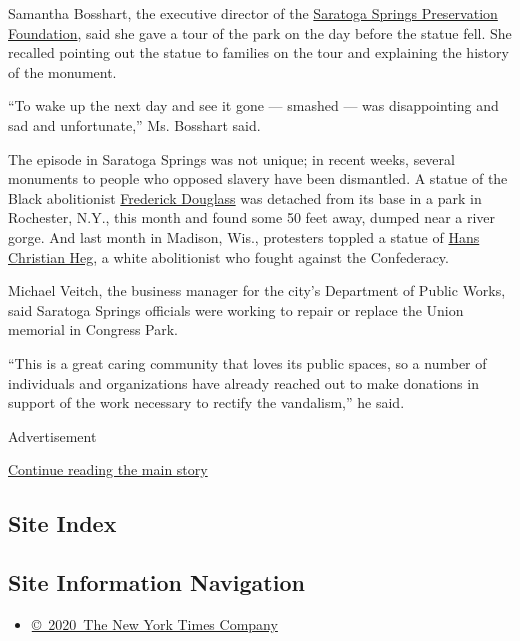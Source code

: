 Samantha Bosshart, the executive director of the
\href{https://www.saratogapreservation.org/}{Saratoga Springs
Preservation Foundation}, said she gave a tour of the park on the day
before the statue fell. She recalled pointing out the statue to families
on the tour and explaining the history of the monument.

``To wake up the next day and see it gone --- smashed --- was
disappointing and sad and unfortunate,'' Ms. Bosshart said.

The episode in Saratoga Springs was not unique; in recent weeks, several
monuments to people who opposed slavery have been dismantled. A statue
of the Black abolitionist
\href{https://www.nytimes3xbfgragh.onion/2020/07/03/arts/frederick-douglass-yale.html?module=inline}{Frederick
Douglass} was detached from its base in a park in Rochester, N.Y., this
month and found some 50 feet away, dumped near a river gorge. And last
month in Madison, Wis., protesters toppled a statue of
\href{https://www.jsonline.com/story/news/local/wisconsin/2020/06/24/hans-christian-hegs-abolitionist-statue-toppled-madison-what-know/3248692001/}{Hans
Christian Heg}, a white abolitionist who fought against the Confederacy.

Michael Veitch, the business manager for the city's Department of Public
Works, said Saratoga Springs officials were working to repair or replace
the Union memorial in Congress Park.

``This is a great caring community that loves its public spaces, so a
number of individuals and organizations have already reached out to make
donations in support of the work necessary to rectify the vandalism,''
he said.

Advertisement

\protect\hyperlink{after-bottom}{Continue reading the main story}

\hypertarget{site-index}{%
\subsection{Site Index}\label{site-index}}

\hypertarget{site-information-navigation}{%
\subsection{Site Information
Navigation}\label{site-information-navigation}}

\begin{itemize}
\tightlist
\item
  \href{https://help.nytimes3xbfgragh.onion/hc/en-us/articles/115014792127-Copyright-notice}{©~2020~The
  New York Times Company}
\end{itemize}

